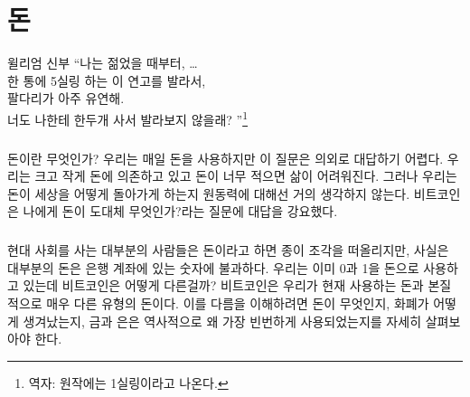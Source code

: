 \chapter{돈}
\label{les:11}

\begin{chapquote}{윌리엄 신부}
	\enquote{나는 젊었을 때부터, \ldots \\
		한 통에 5실링 하는 이 연고를 발라서, \\
		팔다리가 아주 유연해. \\
		너도 나한테 한두개 사서 발라보지 않을래?
	}\footnote{역자: 원작에는 1실링이라고 나온다.}
\end{chapquote}



\paragraph{}
돈이란 무엇인가? 
우리는 매일 돈을 사용하지만 이 질문은 의외로 대답하기 어렵다. 
우리는 크고 작게 돈에 의존하고 있고 돈이 너무 적으면 삶이 어려워진다. 
그러나 우리는 돈이 세상을 어떻게 돌아가게 하는지 원동력에 대해선 거의 생각하지 않는다.
비트코인은 나에게 돈이 도대체 무엇인가?라는 질문에 대답을 강요했다.



\paragraph{}
현대 사회를 사는 대부분의 사람들은 돈이라고 하면 종이 조각을 떠올리지만, 사실은 대부분의 돈은 은행 계좌에 있는 숫자에 불과하다.
우리는 이미 0과 1을 돈으로 사용하고 있는데 비트코인은 어떻게 다른걸까? 
비트코인은 우리가 현재 사용하는 돈과 본질적으로 매우 다른 유형의 돈이다. 
이를 다름을 이해하려면 돈이 무엇인지, 화폐가 어떻게 생겨났는지, 
금과 은은 역사적으로 왜 가장 빈번하게 사용되었는지를 자세히 살펴보아야 한다.

